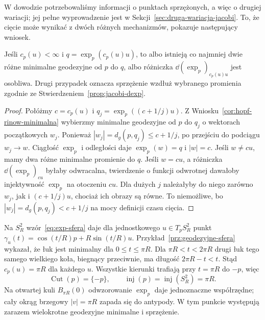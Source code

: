 W dowodzie potrzebowaliśmy informacji o punktach
sprzężonych, a więc o drugiej wariacji; jej pełne
wyprowadzenie jest w Sekcji~\ref{sec:druga-wariacja-jacobi}.
To, że cięcie może wynikać z dwóch różnych mechanizmów,
pokazuje następujący wniosek.

\begin{wniosek}
\label{cor:ciecie-sprzezenie-lub-dwa-promienie}
Jeśli $c_p(u)<\infty$ i $q=\exp_p(c_p(u)u)$,
to albo istnieją co najmniej dwie różne minimalne
geodezyjne od $p$ do $q$, albo różniczka
$\dd(\exp_p)_{c_p(u)u}$ jest osobliwa.
Drugi przypadek oznacza sprzężenie wzdłuż wybranego
promienia zgodnie ze Stwierdzeniem~\ref{prop:jacobi-dexp}.
\end{wniosek}
\begin{proof}
Połóżmy $c=c_p(u)$ i $q_j=\exp_p((c+1/j)u)$.
Z Wniosku~\ref{cor:hopf-rinow-minimalna} wybierzmy
minimalne geodezyjne od $p$ do $q_j$ o wektorach
początkowych $w_j$. Ponieważ
$|w_j|=d_g(p,q_j)\leq c+1/j$, po przejściu do
podciągu $w_j\to w$. Ciągłość $\exp_p$ i odległości
daje $\exp_p(w)=q$ i $|w|=c$.
Jeśli $w\ne cu$, mamy dwa różne minimalne promienie
do $q$. Jeśli $w=cu$, a różniczka
$\dd(\exp_p)_{cu}$ byłaby odwracalna, twierdzenie
o funkcji odwrotnej dawałoby injektywność $\exp_p$
na otoczeniu $cu$. Dla dużych $j$ należałyby
do niego zarówno $w_j$, jak i $(c+1/j)u$,
chociaż ich obrazy są równe. To niemożliwe,
bo $|w_j|=d_g(p,q_j)<c+1/j$
na mocy definicji czasu cięcia.
\end{proof}

\begin{przyklad}
\label{prz:ciecie-sfera}
Na $S_R^2$ wzór~\eqref{eq:exp-sfera} daje dla jednostkowego
$u\in T_pS_R^2$ punkt
$\gamma_u(t)=\cos(t/R)p+R\sin(t/R)u$.
Przykład~\ref{prz:geodezyjne-sfera} wykazał,
że łuk jest minimalny dla $0\leq t\leq\pi R$.
Dla $\pi R<t<2\pi R$ drugi łuk tego samego
wielkiego koła, biegnący przeciwnie, ma długość
$2\pi R-t<t$. Stąd $c_p(u)=\pi R$ dla każdego $u$.
Wszystkie kierunki trafiają przy $t=\pi R$
do $-p$, więc
\[
 \operatorname{Cut}(p)=\{-p\},\qquad
 \operatorname{inj}(p)=\operatorname{inj}(S_R^2)=\pi R.
\]
Na otwartej kuli $B_{\pi R}(0)$ odwzorowanie
$\exp_p$ daje jednoznaczne współrzędne;
cały okrąg brzegowy $|v|=\pi R$ zapada się
do antypody. W tym punkcie występują zarazem
wielokrotne geodezyjne minimalne i sprzężenie.
\end{przyklad}

